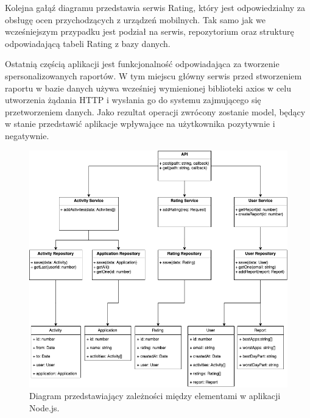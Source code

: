 \documentclass[a4paper,twoside,12pt]{book}
\begin{document}
Kolejna gałąź diagramu przedstawia serwis Rating, który jest odpowiedzialny za obsługę ocen  przychodzących z urządzeń mobilnych. Tak samo jak we wcześniejszym przypadku jest podział na serwis, repozytorium oraz strukturę odpowiadającą tabeli Rating z bazy danych. 

Ostatnią częścią aplikacji jest funkcjonalność odpowiadająca za tworzenie spersonalizowanych raportów. W tym miejscu główny serwis przed stworzeniem raportu w bazie danych używa wcześniej wymienionej biblioteki axios w celu utworzenia żądania HTTP i wysłania go do systemu zajmującego się przetworzeniem danych. Jako rezultat operacji zwrócony zostanie model, będący w stanie przedstawić aplikacje wpływające na użytkownika pozytywnie i negatywnie.

\begin{figure}[h!]
    \centering
    \includegraphics[width=\textwidth]{images/track_apps_backend_diagram.png}
    \caption{Diagram przedstawiający zależności między elementami w aplikacji Node.js.}
    \label{fig:backend_uml}
\end{figure}
\end{document}
